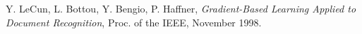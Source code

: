 
\begin{thebibliography}{9}

  Y. LeCun, L. Bottou, Y. Bengio, P. Haffner,
  \emph{Gradient-Based Learning Applied to Document Recognition},
  Proc. of the IEEE,
  November 1998.

\end{thebibliography}
